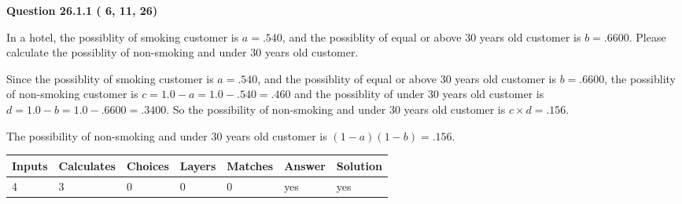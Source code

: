 \documentclass[12pt]{article}
\begin{document}
\vspace{0.2in}
  
{\textbf{\Large{Question
26.1.1 
 (          6,         11,         26)
}}}
  
  
In a hotel, the possiblity of  %
smoking customer is
$a =  %
.540$, and the possiblity of  %
equal or above 30 years old customer is $ b =  %
.6600$.
Please calculate the possiblity of  %
 non-smoking and  %
under 30 years old customer.
 
 
 
\noindent{}
 
 

Since the possiblity of  %
smoking customer is $ a =  %
.540 $,
and the possiblity of  %
equal or above 30 years old customer is $ b =  %
.6600 $,
the possiblity of  %
non-smoking customer is $ c = 1.0 - a = 1.0 -
.540
=  %
.460 $ and the possiblity of  %
under 30 years old
customer is $ d = 1.0 - b = 1.0 -  %
.6600 =  %
.3400  $.
So the possibility of  %
 non-smoking and  %
under 30 years old
customer is $ c \times d =  %
.156 $.
 
 
 
\noindent{}
 
 

 
 
 
\noindent{}
 
 

The possibility of  %
 non-smoking and  %
under 30 years old
customer is $ (1-a)(1-b) =  %
.156 $.
 
 
\noindent{}
 
 

 
\vspace{0.3in}
   
   
   
   
\noindent\begin{tabular}{|l|l|l|l|l|l|l|}
 \hline
Inputs & Calculates & Choices & Layers & Matches & Answer & Solution \\ \hline
           4 & 
           3 & 
           0
  & 
           0 & 
           0 & 
  yes & 
  yes 
  \\ \hline
 \end{tabular}
   
\end{document}
